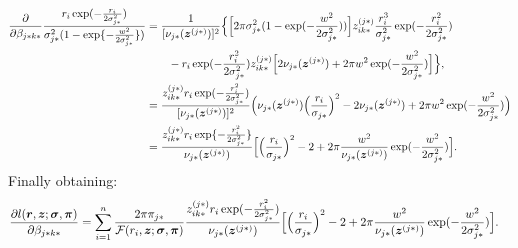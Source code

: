 \begin{align*}
\frac{\partial}{\partial \beta_{j*k*}} \frac{r_i \exp( -\frac{r_i}{2\sigma_{j*}^2} )}{\sigma_{j*}^2(1-\exp\{ -\frac{w^2}{2\sigma_{j*}^2}\})} &= \frac{1}{[\nu_{j*}(\bm{z}^{(j*)})]^2} \Big\{  \Big[ 2 \pi\sigma_{j*}^2(1-\exp( -\frac{w^2}{2\sigma_{j*}^2}))\Big] z_{ik*}^{(j*)} \frac{r_i^3}{\sigma_{j*}^2} \exp( -\frac{r_i^2}{2\sigma_{j*}^2} )\\
&\qquad -r_i \exp( -\frac{r_i^2}{2\sigma_{j*}^2}) z_{ik*}^{(j*)} \Big[ 2  \nu_{j*}(\bm{z}^{(j*)}) +  2\pi w^2 \exp( -\frac{w^2}{2\sigma_{j*}^2})\Big]\Big\},\\
&= \frac{z_{ik*}^{(j*)} r_i \exp(-\frac{r_i^2}{2\sigma_{j*}^2})}{[\nu_{j*}(\bm{z}^{(j*)})]^2} \Big(  \nu_{j*}(\bm{z}^{(j*)}) \Big(\frac{r_i}{\sigma_{j*}}\Big)^2 - 2  \nu_{j*}(\bm{z}^{(j*)}) +  2\pi w^2 \exp( -\frac{w^2}{2\sigma_{j*}^2})\Big)\\
&= \frac{z_{ik*}^{(j*)} r_i \exp\{ -\frac{r_i^2}{2\sigma_{j*}^2}\}}{\nu_{j*}(\bm{z}^{(j*)})} \Big[ \Big(\frac{r_i}{\sigma_{j*}}\Big)^2 - 2 +  2\pi \frac{w^2}{\nu_{j*}(\bm{z}^{(j*)})} \exp( -\frac{w^2}{2\sigma_{j*}^2})\Big].
\end{align*}
Finally obtaining:
\begin{align*}
\frac{\partial l(\bm{r}, \bm{z};\bm{\sigma},\bm{\pi})}{\partial \beta_{j*k*}} &= \sum_{i=1}^n \frac{2 \pi \pi_{j*}}{\mathcal{F}(r_i,\bm{z};\bm{\sigma},\bm{\pi})} \frac{z_{ik*}^{(j*)} r_i \exp( -\frac{r_i^2}{2\sigma_{j*}^2})}{\nu_{j*}(\bm{z}^{(j*)})} \Big[ \Big(\frac{r_i}{\sigma_{j*}}\Big)^2 - 2 +  2\pi \frac{w^2}{\nu_{j*}(\bm{z}^{(j*)})} \exp( -\frac{w^2}{2\sigma_{j*}^2})\Big].
\end{align*}
